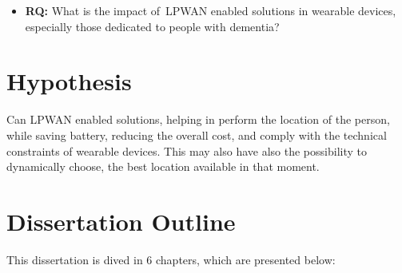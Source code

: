 \begin{itemize}
	\item \textbf{RQ:} What is the impact of~\gls{LPWAN} enabled solutions in wearable devices, especially those dedicated to people with dementia?
\end{itemize} 

\section{Hypothesis}
\label{sec:hypothesis}

Can LPWAN enabled solutions, helping in perform the location of the person, while saving battery, reducing the overall cost, and comply with the technical constraints of wearable devices. 
This may also have also the possibility to dynamically choose, the best location available in that moment.






\section{Dissertation Outline}
\label{sec:dissertaion_outline}
This dissertation is dived in 6 chapters, which are presented below:


